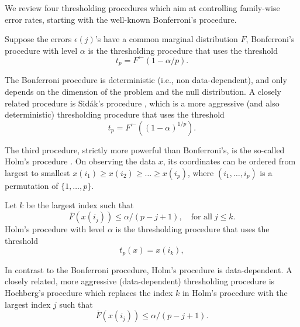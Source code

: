 We review four thresholding procedures which aim at controlling family-wise error rates, starting with the well-known Bonferroni's procedure.
\begin{definition}
Suppose the errors $\epsilon(j)$'s have a common marginal distribution $F$, Bonferroni's procedure with level $\alpha$ is the thresholding procedure that uses the threshold
\begin{equation} \label{eq:Bonferroni-procedure}
    t_p = F^{\leftarrow}(1 - \alpha/p).
\end{equation}
\end{definition}
The Bonferroni procedure is deterministic (i.e., non data-dependent), and only depends on the dimension of the problem and the null distribution.
A closely related procedure is Sid\'ak's procedure \citep{vsidak1967rectangular},
which is a more aggressive (and also deterministic) thresholding procedure that uses the 
threshold
\begin{equation} \label{eq:Sidak-procedure}
    t_p = F^{\leftarrow}((1 - \alpha)^{1/p}).
\end{equation}

The third procedure, strictly more powerful than Bonferroni's, is the so-called Holm's procedure \citep{holm1979simple}.
On observing the data $x$, its coordinates can be ordered from largest to smallest
$x(i_1) \ge x(i_2)  \ge \ldots \ge x(i_p)$,
where $(i_1, \ldots, i_p)$ is a permutation of $\{1, \ldots, p\}$. 
\begin{definition}
Let $k$ be the largest index such that
$$
\overline{F}(x(i_j)) \le \alpha / (p-j+1),\quad \text{for all}\;j\le k.
$$
Holm's procedure with level $\alpha$ is the thresholding procedure that uses the threshold
\begin{equation} \label{eq:Holm-procedure}
    t_p(x) = x(i_{k}),
\end{equation}
\end{definition}
In contrast to the Bonferroni procedure, Holm's procedure is data-dependent.
A closely related, more aggressive (data-dependent) thresholding procedure is Hochberg's procedure \citep{hochberg1988sharper}
which replaces the index $k$ in Holm's procedure with the largest index $j$ such that
$$
\overline{F}(x(i_j)) \le \alpha / (p-j+1).
$$


